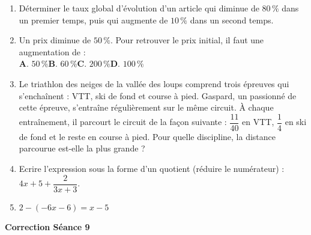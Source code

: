 \documentclass[a4paper,11pt]{article}
\begin{document}
\begin{seanceD}{} %
\begin{enumerate}
\item Déterminer le taux global d'évolution d'un article qui diminue de
  $80\,\%$  dans un premier temps, puis qui augmente de $10\,\%$ dans un second temps. \dotfill


\item Un prix diminue de $50\,\%$.  Pour retrouver le prix initial, il faut une augmentation de :\\ 
    	\textbf{A}. $50\,\%$\qquad \textbf{B}. $60\,\%$\qquad \textbf{C}. $200\,\%$\qquad \textbf{D}. $100\,\%$\qquad 
    	
\item Le triathlon des neiges de la vallée des loups comprend trois épreuves qui s'enchaînent : VTT, ski de fond et course à pied. Gaspard, un passionné de cette épreuve, s'entraîne régulièrement sur le même circuit.  À chaque entraînement, il parcourt le circuit de la façon suivante : $\dfrac{11}{40}$ en VTT, $\dfrac{1}{4}$ en ski de fond et le reste en course à pied.  Pour quelle discipline, la distance parcourue est-elle la plus grande ?

\dotfill

\dotfill

\item  Ecrire l'expression sous la forme d'un quotient (réduire le numérateur) : $4x+5+\dfrac{2}{3x+3}$.

\dotfill

\dotfill



\item  $2-(-6x-6)=x-5$

\dotfill

\dotfill

\end{enumerate}
\end{seanceD}

\begin{center}

\textbf{\textcolor{Couleur8}{Correction Séance 9}}\\
\vspace{2mm}

\end{center}

\newpage
\end{document}
